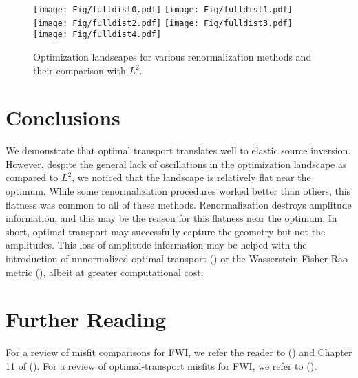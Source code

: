 \begin{figure}
\texttt{[image: Fig/fulldist0.pdf]}
\texttt{[image: Fig/fulldist1.pdf]}
\texttt{[image: Fig/fulldist2.pdf]}
\texttt{[image: Fig/fulldist3.pdf]}
\texttt{[image: Fig/fulldist4.pdf]}
\caption{Optimization landscapes for various renormalization methods and their comparison with $L^2$.}
\label{fig:iaspopt}
\end{figure}

\section{Conclusions}
We demonstrate that optimal transport translates well to elastic source inversion. However, despite the general lack of oscillations in the optimization landscape as compared to $L^2$, we noticed that the landscape is relatively flat near the optimum. While some renormalization procedures worked better than others, this flatness was common to all of these methods. Renormalization destroys amplitude information, and this may be the reason for this flatness near the optimum. In short, optimal transport may successfully capture the geometry but not the amplitudes. This loss of amplitude information may be helped with the introduction of unnormalized optimal transport (\cite{gangbo2019unnormalized}) or the Wasserstein-Fisher-Rao metric (\cite{zhou2018wasserstein}), albeit at greater computational cost. 

\section{Further Reading}
For a review of misfit comparisons for FWI, we refer the reader to (\cite{brossier2010data}) and Chapter 11 of (\cite{fichtner2010full}). For a review of optimal-transport misfits for FWI, we refer to (\cite{metivier2022review}).  






